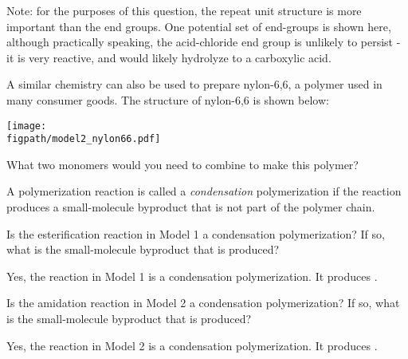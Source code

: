 \begin{activity}
\begin{ctqs}
\begin{solution}[2.5in]
{					Note: for the purposes of this question, the repeat unit structure is more important than the end groups.  One potential set of end-groups is shown here, although practically speaking, the acid-chloride end group is unlikely to persist - it is very reactive, and would likely hydrolyze to a carboxylic acid.}
				\end{solution}
		
		\clearpage
		\question A similar chemistry can also be used to prepare nylon-6,6, a polymer used in many consumer goods.
		The structure of nylon-6,6 is shown below:
		
			\centerline{\texttt{[image: \\figpath/model2\_nylon66.pdf]}}
			
		What two monomers would you need to combine to make this polymer?
			
				\begin{solution}[2in]
				\end{solution}
			
\end{ctqs}
	
\begin{infobox}

A polymerization reaction is called a \emph{condensation} polymerization if the reaction produces a small-molecule byproduct that is not part of the polymer chain.

\end{infobox}
	
\begin{ctqs}
		\question Is the esterification reaction in Model 1 a condensation polymerization?  If so, what is the small-molecule byproduct that is produced?
			
				\begin{solution}[1in]
					Yes, the reaction in Model 1 is a condensation polymerization. It produces .
				\end{solution}
		
		\question Is the amidation reaction in Model 2 a condensation polymerization?  If so, what is the small-molecule byproduct that is produced?
			
				\begin{solution}[1in]
					Yes, the reaction in Model 2 is a condensation polymerization. It produces .
				\end{solution}
		
\end{ctqs}


\end{activity}
